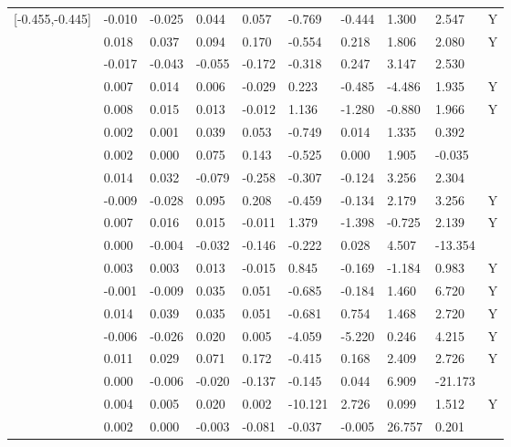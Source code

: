 \begin{table}[ht]
\begin{tabular}{llllllllll}
  [-0.455,-0.445] & -0.010 & -0.025 &  0.044 &  0.057 &  -0.769 &  -0.444 &   1.300 &   2.547 & Y \\ 
  [-0.445,-0.435] &  0.018 &  0.037 &  0.094 &  0.170 &  -0.554 &   0.218 &   1.806 &   2.080 & Y \\ 
  [-0.435,-0.425] & -0.017 & -0.043 & -0.055 & -0.172 &  -0.318 &   0.247 &   3.147 &   2.530 &  \\ 
  [-0.425,-0.415] &  0.007 &  0.014 &  0.006 & -0.029 &   0.223 &  -0.485 &  -4.486 &   1.935 & Y \\ 
  [-0.415,-0.405] &  0.008 &  0.015 &  0.013 & -0.012 &   1.136 &  -1.280 &  -0.880 &   1.966 & Y \\ 
  [-0.405,-0.395] &  0.002 &  0.001 &  0.039 &  0.053 &  -0.749 &   0.014 &   1.335 &   0.392 &  \\ 
  [-0.395,-0.385] &  0.002 &  0.000 &  0.075 &  0.143 &  -0.525 &   0.000 &   1.905 &  -0.035 &  \\ 
  [-0.385,-0.375] &  0.014 &  0.032 & -0.079 & -0.258 &  -0.307 &  -0.124 &   3.256 &   2.304 &  \\ 
  [-0.375,-0.365] & -0.009 & -0.028 &  0.095 &  0.208 &  -0.459 &  -0.134 &   2.179 &   3.256 & Y \\ 
  [-0.365,-0.355] &  0.007 &  0.016 &  0.015 & -0.011 &   1.379 &  -1.398 &  -0.725 &   2.139 & Y \\ 
  [-0.355,-0.345] &  0.000 & -0.004 & -0.032 & -0.146 &  -0.222 &   0.028 &   4.507 & -13.354 &  \\ 
  [-0.345,-0.335] &  0.003 &  0.003 &  0.013 & -0.015 &   0.845 &  -0.169 &  -1.184 &   0.983 & Y \\ 
  [-0.335,-0.325] & -0.001 & -0.009 &  0.035 &  0.051 &  -0.685 &  -0.184 &   1.460 &   6.720 & Y \\ 
  [-0.325,-0.315] &  0.014 &  0.039 &  0.035 &  0.051 &  -0.681 &   0.754 &   1.468 &   2.720 & Y \\ 
  [-0.315,-0.305] & -0.006 & -0.026 &  0.020 &  0.005 &  -4.059 &  -5.220 &   0.246 &   4.215 & Y \\ 
  [-0.305,-0.295] &  0.011 &  0.029 &  0.071 &  0.172 &  -0.415 &   0.168 &   2.409 &   2.726 & Y \\ 
  [-0.295,-0.285] &  0.000 & -0.006 & -0.020 & -0.137 &  -0.145 &   0.044 &   6.909 & -21.173 &  \\ 
  [-0.285,-0.275] &  0.004 &  0.005 &  0.020 &  0.002 & -10.121 &   2.726 &   0.099 &   1.512 & Y \\ 
  [-0.275,-0.265] &  0.002 &  0.000 & -0.003 & -0.081 &  -0.037 &  -0.005 &  26.757 &   0.201 &  \\ 

\end{tabular}
\end{table}
